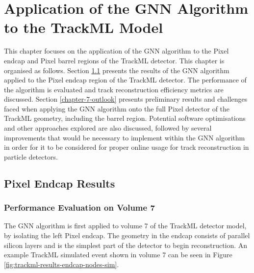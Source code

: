 
\chapter{Application of the GNN Algorithm to the TrackML Model}
\label{chapter-7}

This chapter focuses on the application of the GNN algorithm to the Pixel endcap and Pixel barrel regions of the TrackML detector. This chapter is organised as follows. Section \ref{chapter-7-endcap-results} presents the results of the GNN algorithm applied to the Pixel endcap region of the TrackML detector. The performance of the algorithm is evaluated and track reconstruction efficiency metrics are discussed. Section \ref{chapter-7-outlook} presents preliminary results and challenges faced when applying the GNN algorithm onto the full Pixel detector of the TrackML geometry, including the barrel region. Potential software optimisations and other approaches explored are also discussed, followed by several improvements that would be necessary to implement within the GNN algorithm in order for it to be considered for proper online usage for track reconstruction in particle detectors.



\section{Pixel Endcap Results}
\label{chapter-7-endcap-results}


\subsection{Performance Evaluation on Volume 7}

The GNN algorithm is first applied to volume 7 of the TrackML detector model, by isolating the left Pixel endcap. The geometry in the endcap consists of parallel silicon layers and is the simplest part of the detector to begin reconstruction. An example TrackML simulated event shown in volume 7 can be seen in Figure \ref{fig:trackml-results-endcap-nodes-sim}.

